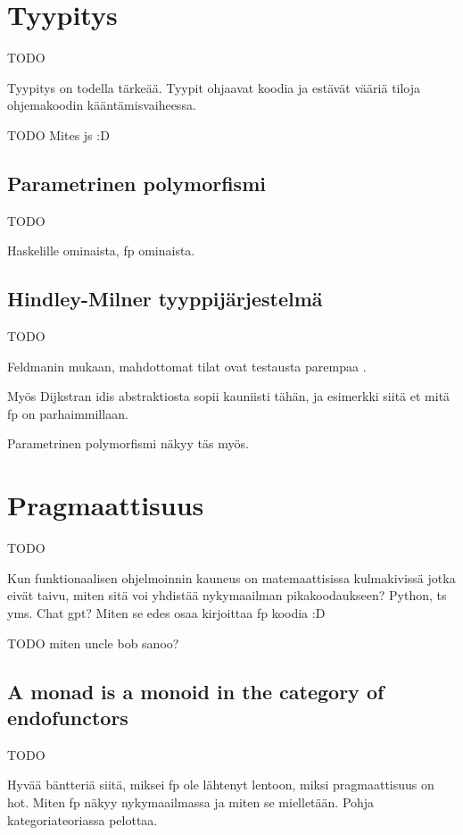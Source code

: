 \section{Tyypitys}

TODO

Tyypitys on todella tärkeää. Tyypit ohjaavat koodia ja estävät vääriä tiloja ohjemakoodin kääntämisvaiheessa.

TODO Mites \gls{js} :D



\subsection{Parametrinen polymorfismi}

TODO

Haskelille ominaista, \gls{fp} ominaista.


\subsection{Hindley-Milner tyyppijärjestelmä}

TODO

Feldmanin mukaan, mahdottomat tilat ovat testausta parempaa \cite{impossiblebetter}.

Myös Dijkstran idis abstraktiosta sopii kauniisti tähän, ja esimerkki siitä et mitä \gls{fp} on parhaimmillaan.

Parametrinen polymorfismi näkyy täs myös.

\section{Pragmaattisuus}

TODO

Kun funktionaalisen ohjelmoinnin kauneus on matemaattisissa kulmakivissä jotka eivät taivu, miten sitä voi yhdistää nykymaailman pikakoodaukseen? Python, \gls{ts} yms. Chat gpt? Miten se edes osaa kirjoittaa fp koodia :D

TODO miten uncle bob sanoo? \cite{martin2017pragmaticfp}

\subsection{A monad is a monoid in the category of endofunctors}

TODO

Hyvää bäntteriä siitä, miksei fp ole lähtenyt lentoon, miksi pragmaattisuus on hot. Miten fp näkyy nykymaailmassa ja miten se mielletään. Pohja kategoriateoriassa pelottaa.

